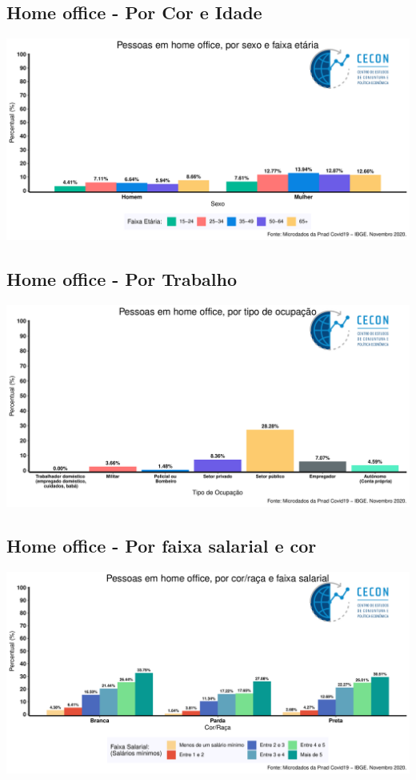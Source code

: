 \documentclass{SelfArx}
\begin{document}
\subsection*{Home office - Por Cor e Idade}
\label{sec:org89e31c0}
\begin{center}
\includegraphics[width=.9\linewidth]{./figs/PNAD_COVID/home_sexo_idade.pdf}
\end{center}

\subsection*{Home office - Por Trabalho}
\label{sec:org3f92665}
\begin{center}
\includegraphics[width=.9\linewidth]{./figs/PNAD_COVID/home_emprego.pdf}
\end{center}

\subsection*{Home office - Por faixa salarial e cor}
\label{sec:org2ba4648}
\begin{center}
\includegraphics[width=.9\linewidth]{./figs/PNAD_COVID/home_renda.pdf}
\end{center}
\end{document}
